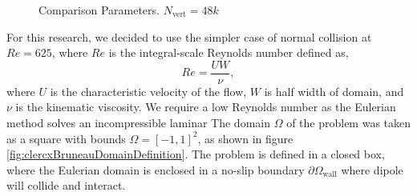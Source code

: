 \begin{figure}[t]
     \caption{Comparison Parameters. $N_{\mathrm{vert}} = 48k$}
     \label{fig:clercxBruneauDomain}
	\end{figure}

For this research, we decided to use the simpler case of normal collision at $Re=625$, where $Re$ is the integral-scale Reynolds number defined as,
	\begin{equation}
	Re = \frac{UW}{\nu},
	\end{equation}
where $U$ is the characteristic velocity of the flow, $W$ is half width of domain, and $\nu$ is the kinematic viscosity. We require a low Reynolds number as the Eulerian method solves an incompressible laminar The domain $\Omega$ of the problem was taken as a square with bounds $\Omega = [-1,1]^2$, as shown in figure \ref{fig:clercxBruneauDomainDefinition}. The problem is defined in a closed box, where the Eulerian domain is enclosed in a no-slip boundary $\partial{\Omega}_{\mathrm{wall}}$ where dipole will collide and interact. 

